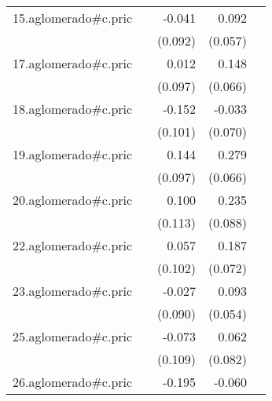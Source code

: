 {\begin{longtable}{l*{4}{D{.}{.}{-1}}}
\addlinespace
15.aglomerado#c.pric&                     &      -0.041         &       0.092         &                     \\
            &                     &     (0.092)         &     (0.057)         &                     \\
\addlinespace
17.aglomerado#c.pric&                     &       0.012         &       0.148\sym{*}  &                     \\
            &                     &     (0.097)         &     (0.066)         &                     \\
\addlinespace
18.aglomerado#c.pric&                     &      -0.152         &      -0.033         &                     \\
            &                     &     (0.101)         &     (0.070)         &                     \\
\addlinespace
19.aglomerado#c.pric&                     &       0.144         &       0.279\sym{***}&                     \\
            &                     &     (0.097)         &     (0.066)         &                     \\
\addlinespace
20.aglomerado#c.pric&                     &       0.100         &       0.235\sym{**} &                     \\
            &                     &     (0.113)         &     (0.088)         &                     \\
\addlinespace
22.aglomerado#c.pric&                     &       0.057         &       0.187\sym{**} &                     \\
            &                     &     (0.102)         &     (0.072)         &                     \\
\addlinespace
23.aglomerado#c.pric&                     &      -0.027         &       0.093         &                     \\
            &                     &     (0.090)         &     (0.054)         &                     \\
\addlinespace
25.aglomerado#c.pric&                     &      -0.073         &       0.062         &                     \\
            &                     &     (0.109)         &     (0.082)         &                     \\
\addlinespace
26.aglomerado#c.pric&                     &      -0.195         &      -0.060         &                     \\

\end{longtable}}
